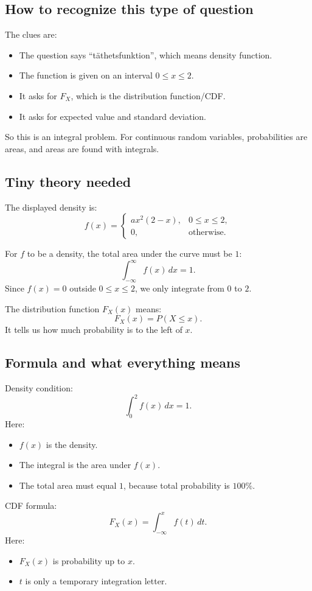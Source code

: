 \documentclass[11pt,a4paper]{article}
\begin{document}
\subsection*{How to recognize this type of question}
The clues are:
\begin{itemize}[leftmargin=*]
    \item The question says ``täthetsfunktion'', which means density function.
    \item The function is given on an interval \(0\le x\le 2\).
    \item It asks for \(F_X\), which is the distribution function/CDF.
    \item It asks for expected value and standard deviation.
\end{itemize}

So this is an integral problem. For continuous random variables, probabilities are areas, and areas are found with integrals.

\subsection*{Tiny theory needed}
The displayed density is:
\[
f(x)=
\begin{cases}
a x^2(2-x), & 0\le x\le 2,\\
0, & \text{otherwise}.
\end{cases}
\]

For \(f\) to be a density, the total area under the curve must be \(1\):
\[
\int_{-\infty}^{\infty}f(x)\,dx=1.
\]
Since \(f(x)=0\) outside \(0\le x\le 2\), we only integrate from \(0\) to \(2\).

The distribution function \(F_X(x)\) means:
\[
F_X(x)=P(X\le x).
\]
It tells us how much probability is to the left of \(x\).

\subsection*{Formula and what everything means}
Density condition:
\[
\int_0^2 f(x)\,dx=1.
\]
Here:
\begin{itemize}[leftmargin=*]
    \item \(f(x)\) is the density.
    \item The integral is the area under \(f(x)\).
    \item The total area must equal \(1\), because total probability is \(100\%\).
\end{itemize}

CDF formula:
\[
F_X(x)=\int_{-\infty}^{x}f(t)\,dt.
\]
Here:
\begin{itemize}[leftmargin=*]
    \item \(F_X(x)\) is probability up to \(x\).
    \item \(t\) is only a temporary integration letter.
\end{itemize}
\end{document}
